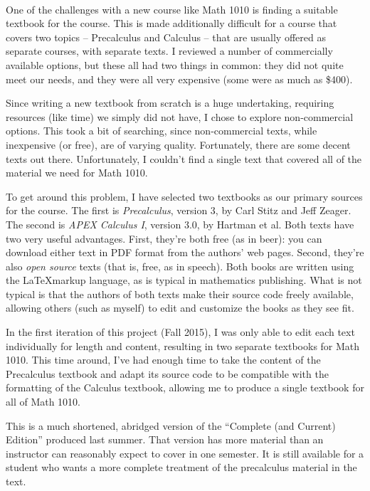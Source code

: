 \thispagestyle{empty}
\Huge
{}\\
\normalsize

One of the challenges with a new course like Math 1010 is finding a suitable textbook for the course. This is made additionally difficult for a course that covers two topics -- Precalculus and Calculus -- that are usually offered as separate courses, with separate texts. I reviewed a number of commercially available options, but these all had two things in common: they did not quite meet our needs, and they were all very expensive (some were as much as \$400).

Since writing a new textbook from scratch is a huge undertaking, requiring resources (like time) we simply did not have, I chose to explore non-commercial options. This took a bit of searching, since non-commercial texts, while inexpensive (or free), are of varying quality. Fortunately, there are some decent texts out there. Unfortunately, I couldn't find a single text that covered all of the material we need for Math 1010.

To get around this problem, I have selected two textbooks as our primary sources for the course. The first is \textit{Precalculus}, version 3, by Carl Stitz and Jeff Zeager. The second is \textit{APEX Calculus I},  version 3.0, by Hartman et al. Both texts have two very useful advantages. First, they're both free (as in beer): you can download either text in PDF format from the authors' web pages. Second, they're also \textit{open source} texts (that is, free, as in speech). Both books are written using the \LaTeX markup language, as is typical in mathematics publishing. What is not typical is that the authors of both texts make their source code freely available, allowing others (such as myself) to edit and customize the books as they see fit.

In the first iteration of this project (Fall 2015), I was only able to edit each text individually for length and content, resulting in two separate textbooks for Math 1010. This time around, I've had enough time to take the content of the Precalculus textbook and adapt its source code to be compatible with the formatting of the Calculus textbook, allowing me to produce a single textbook for all of Math 1010.

This is a much shortened, abridged version of the ``Complete (and Current) Edition'' produced last summer. That version has more material than an instructor can reasonably expect to cover in one semester. It is still available for a student who wants a more complete treatment of the precalculus material in the text.

